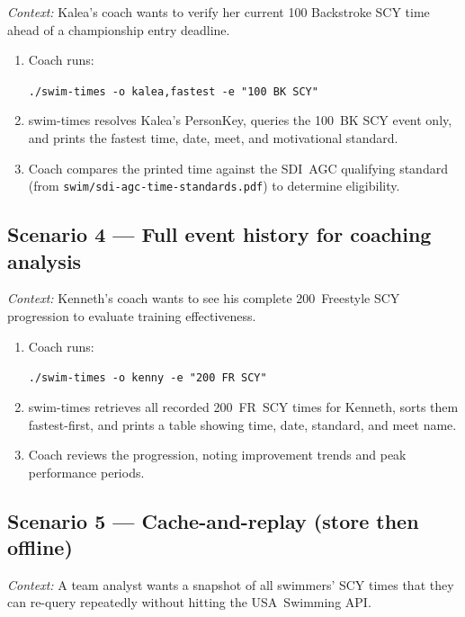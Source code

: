 \documentclass[12pt]{article}
\newcommand{\code}[1]{\texttt{#1}}
\begin{document}
\textit{Context:} Kalea's coach wants to verify her current
100 Backstroke SCY time ahead of a championship entry deadline.

\begin{enumerate}
  \item Coach runs:
        \begin{center}
          \code{./swim-times -o kalea,fastest -e "100 BK SCY"}
        \end{center}
  \item swim-times resolves Kalea's PersonKey, queries the
        100~BK SCY event only, and prints the fastest time,
        date, meet, and motivational standard.
  \item Coach compares the printed time against the SDI~AGC
        qualifying standard (from
        \code{swim/sdi-agc-time-standards.pdf}) to determine
        eligibility.
\end{enumerate}

\subsection{Scenario 4 --- Full event history for coaching analysis}

\textit{Context:} Kenneth's coach wants to see his complete
200~Freestyle SCY progression to evaluate training effectiveness.

\begin{enumerate}
  \item Coach runs:
        \begin{center}
          \code{./swim-times -o kenny -e "200 FR SCY"}
        \end{center}
  \item swim-times retrieves all recorded 200~FR~SCY times for
        Kenneth, sorts them fastest-first, and prints a table
        showing time, date, standard, and meet name.
  \item Coach reviews the progression, noting improvement trends
        and peak performance periods.
\end{enumerate}

\subsection{Scenario 5 --- Cache-and-replay (store then offline)}

\textit{Context:} A team analyst wants a snapshot of all
swimmers' SCY times that they can re-query repeatedly without
hitting the USA~Swimming API.
\end{document}
